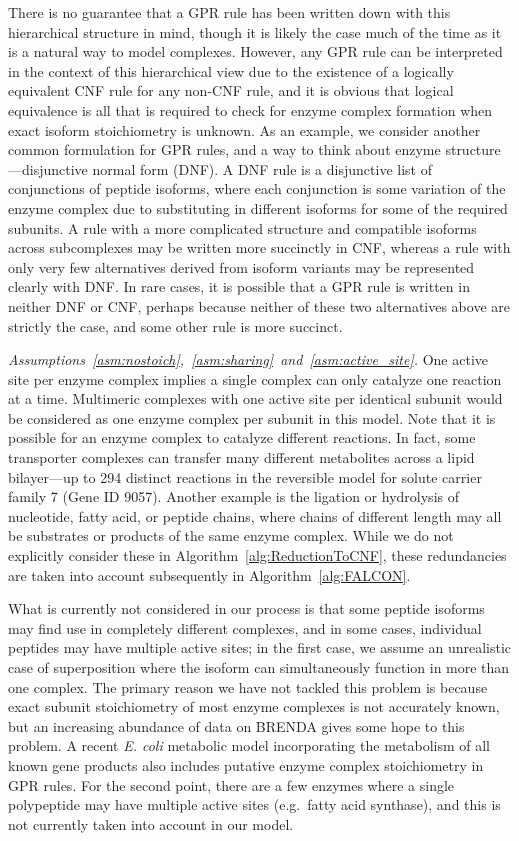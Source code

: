 There is no guarantee that a GPR rule has been written down with this
hierarchical structure in mind, though it is likely the case much of
the time as it is a natural way to model complexes.  However, any GPR
rule can be interpreted in the context of this hierarchical view due
to the existence of a logically equivalent CNF rule for any non-CNF
rule, and it is obvious that logical equivalence is all that is
required to check for enzyme complex formation when exact isoform
stoichiometry is unknown.  As an example, we consider another common
formulation for GPR rules, and a way to think about enzyme
structure---disjunctive normal form (DNF).  A DNF rule is a
disjunctive list of conjunctions of peptide isoforms, where each
conjunction is some variation of the enzyme complex due to
substituting in different isoforms for some of the required
subunits. A rule with a more complicated structure and compatible
isoforms across subcomplexes may be written more succinctly in CNF,
whereas a rule with only very few alternatives derived from isoform
variants may be represented clearly with DNF.  In rare cases, it is
possible that a GPR rule is written in neither DNF or CNF, perhaps
because neither of these two alternatives above are strictly the case,
and some other rule is more succinct.

\emph{Assumptions~\ref{asm:nostoich},~\ref{asm:sharing}~and~\ref{asm:active_site}.}
One active site per enzyme complex implies a single complex can only
catalyze one reaction at a time. Multimeric complexes with one active
site per identical subunit would be considered as one enzyme complex
per subunit in this model. Note that it is possible for an enzyme
complex to catalyze different reactions. In fact, some transporter
complexes can transfer many different metabolites across a lipid
bilayer---up to 294 distinct reactions in the reversible model for
solute carrier family 7 (Gene ID 9057).  Another example is the
ligation or hydrolysis of nucleotide, fatty acid, or peptide chains,
where chains of different length may all be substrates or products of
the same enzyme complex. While we do not explicitly consider these in
Algorithm~\ref{alg:ReductionToCNF}, these redundancies are taken into
account subsequently in Algorithm~\ref{alg:FALCON}.

What is currently not considered in our process is that some peptide
isoforms may find use in completely different complexes, and in some
cases, individual peptides may have multiple active sites; in the
first case, we assume an unrealistic case of superposition where the
isoform can simultaneously function in more than one complex. The
primary reason we have not tackled this problem is because exact
subunit stoichiometry of most enzyme complexes is not accurately
known, but an increasing abundance of data on BRENDA
\citep{Schomburg2013} gives some hope to this problem. A recent
\textit{E. coli} metabolic model incorporating the metabolism of all
known gene products \citep{O'Brien2013} also includes putative
enzyme complex stoichiometry in GPR rules. For the second point, there
are a few enzymes where a single polypeptide may have multiple active
sites (e.g.\ fatty acid synthase), and this is not currently taken into
account in our model. 

